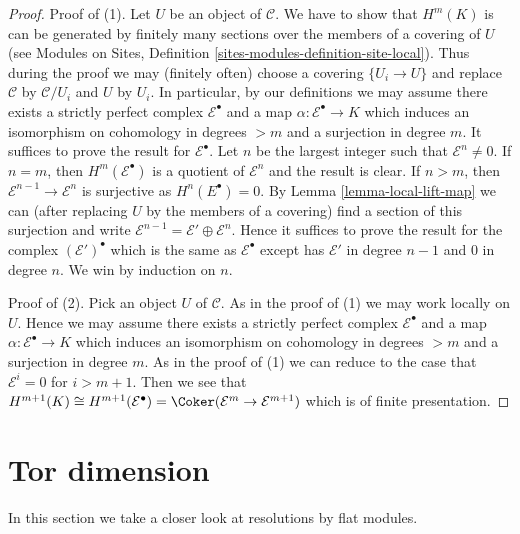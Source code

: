 \begin{proof}
Proof of (1). Let $U$ be an object of $\mathcal{C}$. We have to show that
$H^m(K)$ is can be generated by finitely many sections over the members of
a covering of $U$ (see
Modules on Sites, Definition \ref{sites-modules-definition-site-local}).
Thus during the proof we may (finitely often) choose a covering
$\{U_i \to U\}$ and replace $\mathcal{C}$ by $\mathcal{C}/U_i$ and
$U$ by $U_i$. In particular, by our definitions we may assume there exists
a strictly perfect complex $\mathcal{E}^\bullet$ and a map
$\alpha : \mathcal{E}^\bullet \to K$ which induces
an isomorphism on cohomology in degrees $> m$ and a surjection in degree $m$.
It suffices to prove the result for $\mathcal{E}^\bullet$.
Let $n$ be the largest integer such that $\mathcal{E}^n \not = 0$.
If $n = m$, then $H^m(\mathcal{E}^\bullet)$ is a quotient of
$\mathcal{E}^n$ and the result is clear.
If $n > m$, then $\mathcal{E}^{n - 1} \to \mathcal{E}^n$ is surjective as
$H^n(E^\bullet) = 0$. By Lemma \ref{lemma-local-lift-map}
we can (after replacing $U$ by the members of a covering)
find a section of this surjection and write
$\mathcal{E}^{n - 1} = \mathcal{E}' \oplus \mathcal{E}^n$.
Hence it suffices to prove the result for the complex
$(\mathcal{E}')^\bullet$ which is the same as $\mathcal{E}^\bullet$
except has $\mathcal{E}'$ in degree $n - 1$ and $0$ in degree $n$.
We win by induction on $n$.

\medskip\noindent
Proof of (2). Pick an object $U$ of $\mathcal{C}$.
As in the proof of (1) we may work locally on $U$.
Hence we may assume there exists a strictly perfect complex
$\mathcal{E}^\bullet$ and a map
$\alpha : \mathcal{E}^\bullet \to K$ which induces
an isomorphism on cohomology in degrees $> m$ and a surjection in degree $m$.
As in the proof of (1) we can reduce to the case that $\mathcal{E}^i = 0$
for $i > m + 1$. Then we see that
$H^{m + 1}(K) \cong H^{m + 1}(\mathcal{E}^\bullet) =
\Coker(\mathcal{E}^m \to \mathcal{E}^{m + 1})$
which is of finite presentation.
\end{proof}








\section{Tor dimension}
\label{section-tor}

\noindent
In this section we take a closer look at resolutions by flat modules.

